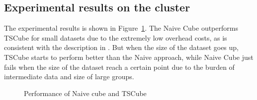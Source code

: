 \documentclass{article}
\begin{document}
\subsection{Experimental results on the cluster}

The experimental results is shown in Figure~\ref{fig:performance}. The Naive Cube outperforms TSCube for small datasets due to the extremely low overhead costs, as is consistent with the description in \cite{nandi2012data}. But when the size of the dataset goes up, TSCube starts to perform better than the Naive approach, while Naive Cube just fails when the size of the dataset reach a certain point due to the burden of intermediate data and size of large groups.

\begin{figure}[H]
\centering
{}

\caption{Performance of Naive cube and TSCube}
\label{fig:performance}
\end{figure}


\end{document}
